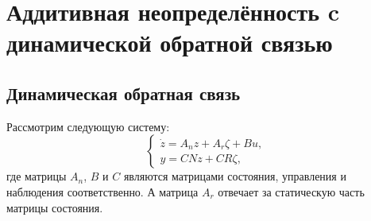 \chapter{Аддитивная неопределённость c динамической обратной связью}\label{ch:ch5}
\section{Динамическая обратная связь}\label{sec:ch5/sect1}
Рассмотрим следующую систему:
\begin{equation}
	\label{eq:part5_linear_dynamics}
	\begin{cases}
		\dot z={A}_n {z} + {A}_r {\zeta} + {B} {u},\\
		y = {C} {N} {z} + {C} {R} {\zeta},
	\end{cases}
\end{equation}
где матрицы $A_n$,  $B$ и $C$ являются матрицами состояния, управления и наблюдения соответственно. А матрица ${A}_r$ отвечает за статическую часть матрицы состояния.

